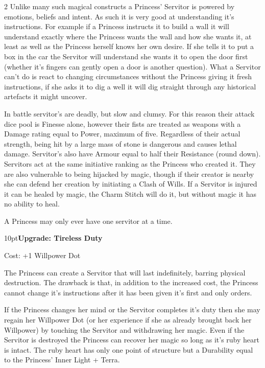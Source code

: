 \begin{multicols}{2}
Unlike many such magical constructs a Princess' Servitor is powered by emotions, beliefs and intent. As such it is very good at understanding it's instructions. For example if a Princess instructs it to build a wall it will understand exactly where the Princess wants the wall and how she wants it, at least as well as the Princess herself knows her own desire. If she tells it to put a box in the car the Servitor will understand she wants it to open the door first (whether it's fingers can gently open a door is another question). What a Servitor can't do is react to changing circumstances without the Princess giving it fresh instructions, if she asks it to dig a well it will dig straight through any historical artefacts it might uncover.

In battle servitor's are deadly, but slow and clumsy. For this reason their attack dice pool is Finesse alone, however their fists are treated as weapons with a Damage rating equal to Power, maximum of five. Regardless of their actual strength, being hit by a large mass of stone is dangerous and causes lethal damage. Servitor's also have Armour equal to half their Resistance (round down). Servitors act at the same initiative ranking as the Princess who created it. They are also vulnerable to being hijacked by magic, though if their creator is nearby she can defend her creation by initiating a Clash of Wills. If a Servitor is injured it can be healed by magic, the Charm Stitch will do it, but without magic it has no ability to heal.

A Princess may only ever have one servitor at a time.

\begin{myindentpar}{10pt}\textbf{Upgrade: Tireless Duty}

Cost: +1 Willpower Dot

The Princess can create a Servitor that will last indefinitely, barring physical destruction. The drawback is that, in addition to the increased cost, the Princess cannot change it's instructions after it has been given it's first and only orders.

If the Princess changes her mind or the Servitor completes it's duty then she may regain her Willpower Dot (or her experience if she as already brought back her Willpower) by touching the Servitor and withdrawing her magic. Even if the Servitor is destroyed the Princess can recover her magic so long as it's ruby heart is intact. The ruby heart has only one point of structure but a Durability equal to the Princess' Inner Light + Terra. \end{myindentpar}





\end{multicols}
